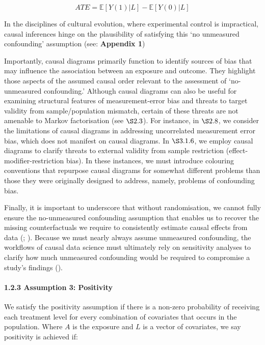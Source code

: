 \documentclass[
  singlecolumn]{article}
\let\oldparagraph\paragraph
\renewcommand{\paragraph}[1]{\oldparagraph{#1}\mbox{}}
\begin{document}
\[
ATE = \mathbb{E}[Y(1) | L] - \mathbb{E}[Y(0) | L]
\]

In the disciplines of cultural evolution, where experimental control is
impractical, causal inferences hinge on the plausibility of satisfying
this `no unmeasured confounding' assumption (see: \textbf{Appendix 1})

Importantly, causal diagrams primarily function to identify sources of
bias that may influence the association between an exposure and outcome.
They highlight those aspects of the assumed causal order relevant to the
assessment of `no-unmeasured confounding.' Although causal diagrams can
also be useful for examining structural features of measurement-error
bias and threats to target validity from sample/population mismatch,
certain of these threats are not amenable to Markov factorisation (see
\(\S 2.3\)). For instance, in \(\S 2.8\), we consider the limitations of
causal diagrams in addressing uncorrelated measurement error bias, which
does not manifest on causal diagrams. In \(\S 3.1.6\), we employ causal
diagrams to clarify threats to external validity from sample restriction
(effect-modifier-restriction bias). In these instances, we must
introduce colouring conventions that repurpose causal diagrams for
somewhat different problems than those they were originally designed to
address, namely, problems of confounding bias.

Finally, it is important to underscore that without randomisation, we
cannot fully ensure the no-unmeasured confounding assumption that
enables us to recover the missing counterfactuals we require to
consistently estimate causal effects from data
(;
). Because we must
nearly always assume unmeasured confounding, the workflows of causal
data science must ultimately rely on sensitivity analyses to clarify how
much unmeasured confounding would be required to compromise a study's
findings ().

\paragraph{1.2.3 Assumption 3:
Positivity}\label{assumption-3-positivity}

We satisfy the positivity assumption if there is a non-zero probability
of receiving each treatment level for every combination of covariates
that occurs in the population. Where \(A\) is the exposure and \(L\) is
a vector of covariates, we say positivity is achieved if:
\end{document}
